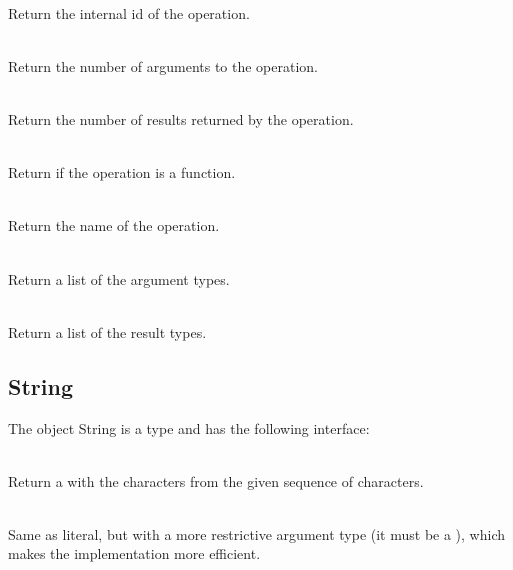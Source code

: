 \begin{desc}
  \item[\kw{function}  getID \returns{} \/\LB{}\tn{Integer}\/\RB{}]~\\
    Return the internal id of the operation.
  \item[\kw{function}  getNArgs \returns{} \/\LB{}\tn{Integer}\/\RB{}]~\\
    Return the number of arguments to the operation.
  \item[\kw{function}  getNRess \returns{} \/\LB{}\tn{Integer}\/\RB{}]~\\
    Return the number of results returned by the operation.
  \item[\kw{function}  getIsFunction \returns{} \/\LB{}\tn{Boolean}\/\RB{}]~\\
    Return  if the operation is a function.
  \item[\kw{function}  getName \returns{} \/\LB{}\tn{String}\/\RB{}]~\\
    Return the name of the operation.
  \item[\kw{function}  getArguments \returns{} \/\LB{}AParamList\/\RB{}]~\\
    Return a list of the argument types.
  \item[\kw{function}  getResults   \returns{} \/\LB{}AParamList\/\RB{}]~\\
    Return a list of the result types.
\end{desc}

\subsection{String}
\label{builtin String}

The object String is a type and has the following interface:

\begin{desc}
  \item[\kw{operation} Literal\/\LB{}rep \CO{} Sequence.of\/\LB{}Character\/\RB{}, offset \CO{} \tn{Integer}, len \CO{} \tn{Integer}\/\RB{} \returns{} \/\LB{}\tn{String}\/\RB{}]~\\
    Return a  with the characters from the given sequence of
    characters.
  \item[\kw{operation} FLiteral\/\LB{}rep \CO{} VectorOfChar, offset \CO{} \tn{Integer}, len \CO{} \tn{Integer}\/\RB{} \returns{} \/\LB{}\tn{String}\/\RB{}]~\\
    Same as literal, but with a more restrictive argument type (it must be a
    ), which makes the implementation more efficient.
\end{desc}

